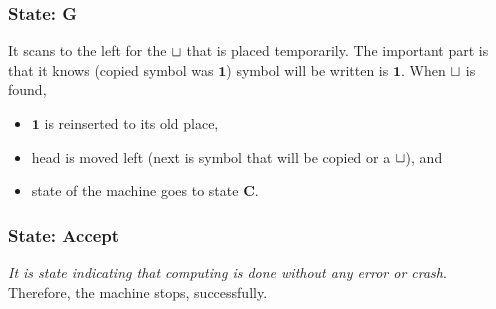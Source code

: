 \subsubsection*{State: G}
\label{q2-state:G}

It scans to the left for the $\sqcup$ that is placed temporarily. The important part is that it knows (copied symbol was $\mathbf{1}$) symbol will be written is $\mathbf{1}$. When $\sqcup$ is found,
\begin{itemize}
  \item $\mathbf{1}$ is reinserted to its old place,
  \item head is moved left (next is symbol that will be copied or a $\sqcup$), and
  \item state of the machine goes to state \hyperref[q2-state:C]{$\mathbf{C}$}.
\end{itemize}

\subsubsection*{State: Accept}
\label{q2-state:Accept}

\textit{It is state indicating that computing is done without any error or crash}. Therefore, the machine stops, successfully.
